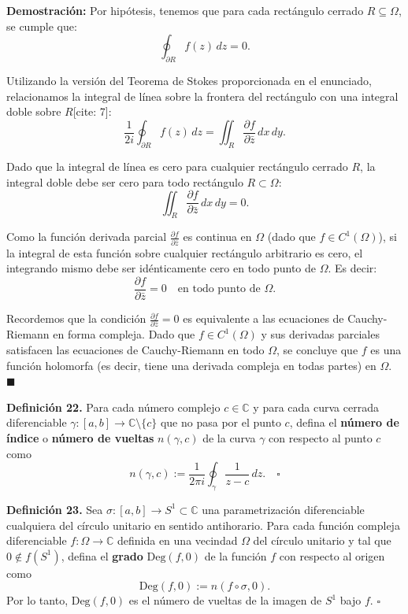 \documentclass[11pt,a4paper]{article}
\theoremstyle{definition}
\theoremstyle{plain}
\theoremstyle{remark}
\begin{document}
	\vspace{1em}
	\noindent \textbf{Demostración:}
	Por hipótesis, tenemos que para cada rectángulo cerrado $R \subseteq \Omega$, se cumple que:
	\[
	\oint_{\partial R} f(z) \, dz = 0.
	\]
	
	Utilizando la versión del Teorema de Stokes proporcionada en el enunciado, relacionamos la integral de línea sobre la frontera del rectángulo con una integral doble sobre $R$[cite: 7]:
	\[
	\frac{1}{2i} \oint_{\partial R} f(z) \, dz = \iint_{R} \frac{\partial f}{\partial \bar{z}} \, dx \, dy.
	\]
	
	Dado que la integral de línea es cero para cualquier rectángulo cerrado $R$, la integral doble debe ser cero para todo rectángulo $R \subset \Omega$:
	\[
	\iint_{R} \frac{\partial f}{\partial \bar{z}} \, dx \, dy = 0.
	\]
	
	Como la función derivada parcial $\frac{\partial f}{\partial \bar{z}}$ es continua en $\Omega$ (dado que $f \in C^1(\Omega)$), si la integral de esta función sobre cualquier rectángulo arbitrario es cero, el integrando mismo debe ser idénticamente cero en todo punto de $\Omega$. Es decir:
	\[
	\frac{\partial f}{\partial \bar{z}} = 0 \quad \text{en todo punto de } \Omega.
	\]
	
	Recordemos que la condición $\frac{\partial f}{\partial \bar{z}} = 0$ es equivalente a las ecuaciones de Cauchy-Riemann en forma compleja. Dado que $f \in C^1(\Omega)$ y sus derivadas parciales satisfacen las ecuaciones de Cauchy-Riemann en todo $\Omega$, se concluye que $f$ es una función holomorfa (es decir, tiene una derivada compleja en todas partes) en $\Omega$. $\blacksquare$
	
	\noindent \textbf{Definición 22.} Para cada número complejo $c \in \mathbb{C}$ y para cada curva cerrada diferenciable $\gamma : [a, b] \to \mathbb{C} \setminus \{c\}$ que no pasa por el punto $c$, defina el \textbf{número de índice} o \textbf{número de vueltas} $n(\gamma, c)$ de la curva $\gamma$ con respecto al punto $c$ como
	\[
	n(\gamma, c) := \frac{1}{2\pi i} \oint_{\gamma} \frac{1}{z - c} \, dz. \quad \square
	\]
	
	\vspace{1.5em}
	\noindent \textbf{Definición 23.} Sea $\sigma : [a, b] \to S^1 \subset \mathbb{C}$ una parametrización diferenciable cualquiera del círculo unitario en sentido antihorario. Para cada función compleja diferenciable $f : \Omega \to \mathbb{C}$ definida en una vecindad $\Omega$ del círculo unitario y tal que $0 \notin f(S^1)$, defina el \textbf{grado} $\text{Deg}(f, 0)$ de la función $f$ con respecto al origen como
	\[
	\text{Deg}(f, 0) := n(f \circ \sigma, 0).
	\]
	Por lo tanto, $\text{Deg}(f, 0)$ es el número de vueltas de la imagen de $S^1$ bajo $f$. $\square$
	
\end{document}
